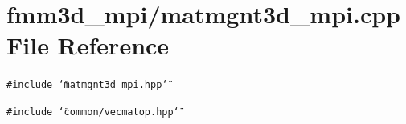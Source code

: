 \section{fmm3d\_\-mpi/matmgnt3d\_\-mpi.cpp File Reference}
\label{matmgnt3d__mpi_8cpp}


{\tt \#include \char`\"{}matmgnt3d\_\-mpi.hpp\char`\"{}}\par
{\tt \#include \char`\"{}common/vecmatop.hpp\char`\"{}}\par
